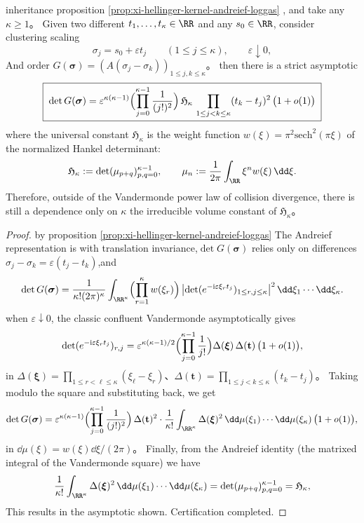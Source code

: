 \begin{theorem}\label{thm:xi-hellinger-gram-collision-hankel-constant}
inheritance proposition \ref{prop:xi-hellinger-kernel-andreief-loggas} , and take any \(\kappa\ge 1\)。
Given two different \(t_1,\dots,t_\kappa\in\RR\) and any \(s_0\in\RR\), consider clustering scaling
\[
\sigma_j=s_0+\varepsilon t_j\qquad(1\le j\le \kappa),\qquad \varepsilon\downarrow 0,
\]
And order \(G(\boldsymbol{\sigma})=(A(\sigma_j-\sigma_k))_{1\le j,k\le\kappa}\)。
then there is a strict asymptotic
\[
\boxed{\;
\det G(\boldsymbol{\sigma})
=\varepsilon^{\kappa(\kappa-1)}
\Bigl(\prod_{j=0}^{\kappa-1}\frac{1}{(j!)^{2}}\Bigr)\,
\mathfrak H_\kappa\,
\prod_{1\le j<k\le\kappa}(t_k-t_j)^{2}\,\bigl(1+o(1)\bigr)\;}
\]
where the universal constant \(\mathfrak H_\kappa\) is the weight function \(w(\xi)=\pi^{2}\mathrm{sech}^{2}(\pi\xi)\) of the normalized Hankel determinant:
\[
\mathfrak H_\kappa:=\det(\mu_{p+q})_{p,q=0}^{\kappa-1},\qquad
\mu_n:=\frac{1}{2\pi}\int_{\RR}\xi^{n}w(\xi)\,\dd\xi.
\]
Therefore, outside of the Vandermonde power law of collision divergence, there is still a dependence only on \(\kappa\) the irreducible volume constant of \(\mathfrak H_\kappa\)。
\end{theorem}
\begin{proof}
by proposition \ref{prop:xi-hellinger-kernel-andreief-loggas} The Andreief representation is with translation invariance,\(\det G(\boldsymbol{\sigma})\) relies only on differences \(\sigma_j-\sigma_k=\varepsilon(t_j-t_k)\),and
\[
\det G(\boldsymbol{\sigma})
=\frac{1}{\kappa!(2\pi)^{\kappa}}
\int_{\RR^\kappa}\Bigl(\prod_{r=1}^{\kappa}w(\xi_r)\Bigr)\,
\bigl|\det(e^{-\mathrm{i}\varepsilon\xi_r t_j})_{1\le r,j\le\kappa}\bigr|^{2}\,\dd\xi_1\cdots\dd\xi_\kappa.
\]
when \(\varepsilon\downarrow 0\), the classic confluent Vandermonde asymptotically gives
\[
\det(e^{-\mathrm{i}\varepsilon\xi_r t_j})_{r,j}
=\varepsilon^{\kappa(\kappa-1)/2}\Bigl(\prod_{j=0}^{\kappa-1}\frac{1}{j!}\Bigr)
\Delta(\boldsymbol{\xi})\,\Delta(\mathbf t)\,\bigl(1+o(1)\bigr),
\]
in \(\Delta(\boldsymbol{\xi})=\prod_{1\le r<\ell\le\kappa}(\xi_\ell-\xi_r)\)、\(\Delta(\mathbf t)=\prod_{1\le j<k\le\kappa}(t_k-t_j)\)。
Taking modulo the square and substituting back, we get
\[
\det G(\boldsymbol{\sigma})
=\varepsilon^{\kappa(\kappa-1)}\Bigl(\prod_{j=0}^{\kappa-1}\frac{1}{(j!)^{2}}\Bigr)\,
\Delta(\mathbf t)^{2}\cdot
\frac{1}{\kappa!}\int_{\RR^\kappa}\Delta(\boldsymbol{\xi})^{2}\,\dd\mu(\xi_1)\cdots\dd\mu(\xi_\kappa)\,\bigl(1+o(1)\bigr),
\]
in \(\dd\mu(\xi)=w(\xi)\dd\xi/(2\pi)\)。
Finally, from the Andreief identity (the matrixed integral of the Vandermonde square) we have
\[
\frac{1}{\kappa!}\int_{\RR^\kappa}\Delta(\boldsymbol{\xi})^{2}\,\dd\mu(\xi_1)\cdots\dd\mu(\xi_\kappa)
=\det(\mu_{p+q})_{p,q=0}^{\kappa-1}=\mathfrak H_\kappa,
\]
This results in the asymptotic shown. Certification completed.
\end{proof}

